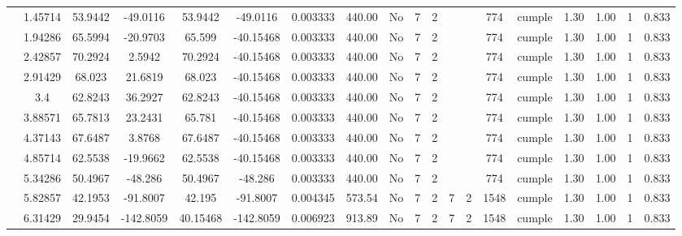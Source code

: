 \begin{table}[H]
{\begin{tabular}{|c|c|c|c|c|c|r|c|c|c|c|c|c|c|c|c|c|c|c|}
\cline{2-19}        & 1.45714 & 53.9442 & -49.0116 & 53.9442 & -49.0116 & 0.003333 & 440.00 & No  & 7   & 2   &     &     & 774 & \cellcolor[rgb]{ .776,  .937,  .808}cumple & 1.30 & 1.00 & 1   & 0.833 \bigstrut\\
\cline{2-19}        & 1.94286 & 65.5994 & -20.9703 & 65.599 & -40.15468 & 0.003333 & 440.00 & No  & 7   & 2   &     &     & 774 & \cellcolor[rgb]{ .776,  .937,  .808}cumple & 1.30 & 1.00 & 1   & 0.833 \bigstrut\\
\cline{2-19}        & 2.42857 & 70.2924 & 2.5942 & 70.2924 & -40.15468 & 0.003333 & 440.00 & No  & 7   & 2   &     &     & 774 & \cellcolor[rgb]{ .776,  .937,  .808}cumple & 1.30 & 1.00 & 1   & 0.833 \bigstrut\\
\cline{2-19}        & 2.91429 & 68.023 & 21.6819 & 68.023 & -40.15468 & 0.003333 & 440.00 & No  & 7   & 2   &     &     & 774 & \cellcolor[rgb]{ .776,  .937,  .808}cumple & 1.30 & 1.00 & 1   & 0.833 \bigstrut\\
\cline{2-19}        & 3.4 & 62.8243 & 36.2927 & 62.8243 & -40.15468 & 0.003333 & 440.00 & No  & 7   & 2   &     &     & 774 & \cellcolor[rgb]{ .776,  .937,  .808}cumple & 1.30 & 1.00 & 1   & 0.833 \bigstrut\\
\cline{2-19}        & 3.88571 & 65.7813 & 23.2431 & 65.781 & -40.15468 & 0.003333 & 440.00 & No  & 7   & 2   &     &     & 774 & \cellcolor[rgb]{ .776,  .937,  .808}cumple & 1.30 & 1.00 & 1   & 0.833 \bigstrut\\
\cline{2-19}        & 4.37143 & 67.6487 & 3.8768 & 67.6487 & -40.15468 & 0.003333 & 440.00 & No  & 7   & 2   &     &     & 774 & \cellcolor[rgb]{ .776,  .937,  .808}cumple & 1.30 & 1.00 & 1   & 0.833 \bigstrut\\
\cline{2-19}        & 4.85714 & 62.5538 & -19.9662 & 62.5538 & -40.15468 & 0.003333 & 440.00 & No  & 7   & 2   &     &     & 774 & \cellcolor[rgb]{ .776,  .937,  .808}cumple & 1.30 & 1.00 & 1   & 0.833 \bigstrut\\
\cline{2-19}        & 5.34286 & 50.4967 & -48.286 & 50.4967 & -48.286 & 0.003333 & 440.00 & No  & 7   & 2   &     &     & 774 & \cellcolor[rgb]{ .776,  .937,  .808}cumple & 1.30 & 1.00 & 1   & 0.833 \bigstrut\\
\cline{2-19}        & 5.82857 & 42.1953 & -91.8007 & 42.195 & -91.8007 & 0.004345 & 573.54 & No  & 7   & 2   & 7   & 2   & 1548 & \cellcolor[rgb]{ .776,  .937,  .808}cumple & 1.30 & 1.00 & 1   & 0.833 \bigstrut\\
\cline{2-19}        & 6.31429 & 29.9454 & -142.8059 & 40.15468 & -142.8059 & 0.006923 & 913.89 & No  & 7   & 2   & 7   & 2   & 1548 & \cellcolor[rgb]{ .776,  .937,  .808}cumple & 1.30 & 1.00 & 1   & 0.833 \bigstrut\\

\end{tabular}}
\end{table}
